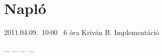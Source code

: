 %
\section{Napló}

\begin{naplo}

\bejegyzes
{2011.04.09.~10:00~} %
{6 óra} %
{Kriván B.} %
{Implementáció} %

\bejegyzes
{...}
{...}
{...}
{...}


\end{naplo}

